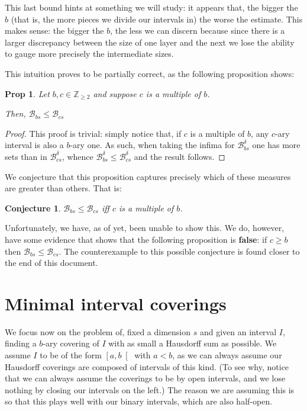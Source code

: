 \documentclass[11pt]{amsart}
\newcommand{\Z}{\mathbb{Z}}
\newcommand{\BB}{\mathcal{B}}
\newtheorem{prop}{Prop}
\newtheorem{conjecture}{Conjecture}
\begin{document}
This last bound hints at something we will study: it appears that, the bigger the $b$ (that is, the more pieces we divide our intervals in) the worse the estimate. This makes sense: the bigger the $b$, the less we can discern because since there is a larger discrepancy between the size of one layer and the next we lose the ability to gauge more precisely the intermediate sizes.

This intuition proves to be partially correct, as the following proposition shows:

\begin{prop}
Let $b, c \in \Z_{\geq 2}$ and suppose $c$ is a multiple of $b$.

Then, $\BB_{bs} \leq \BB_{cs}$
\end{prop}

\begin{proof}
This proof is trivial: simply notice that, if $c$ is a multiple of $b$, any $c$-ary interval is also a $b$-ary one. As such, when taking the infima for $\BB_{bs}^\delta$ one has more sets than in $\BB_{cs}^\delta$, whence $\BB_{bs}^\delta \leq \BB_{cs}^\delta$ and the result follows.
\end{proof}

We conjecture that this proposition captures precisely which of these measures are greater than others. That is:

\begin{conjecture}
$\BB_{bs} \leq \BB_{cs}$ iff $c$ is a multiple of $b$.
\end{conjecture}

Unfortunately, we have, as of yet, been unable to show this. We do, however, have some evidence that shows that the following proposition is \textbf{false}: if $c \geq b$ then $\BB_{bs} \leq \BB_{cs}$. The counterexample to this possible conjecture is found closer to the end of this document.

\section{Minimal interval coverings}

We focus now on the problem of, fixed a dimension $s$ and given an interval $I$, finding a $b$-ary covering of $I$ with as small a Hausdorff sum as possible. We assume $I$ to be of the form $\left[ a, b \right[$ with $a < b$, as we can always assume our Hausdorff coverings are composed of intervals of this kind. (To see why, notice that we can always assume the coverings to be by open intervals, and we lose nothing by closing our intervals on the left.) The reason we are assuming this is so that this plays well with our binary intervals, which are also half-open.
\end{document}

